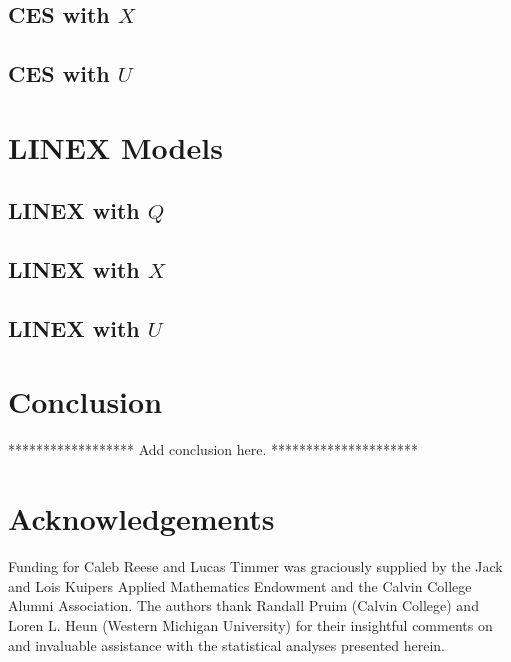 \documentclass[preprint,authoryear,12pt]{elsarticle}\usepackage{graphicx, color}
\begin{document}
\subsection{CES with $X$}

\subsection{CES with $U$}

\section{LINEX Models}

\subsection{LINEX with $Q$}

\subsection{LINEX with $X$}

\subsection{LINEX with $U$}

\section{Conclusion}

****************** Add conclusion here. *********************

\section*{Acknowledgements}

Funding for Caleb Reese and Lucas Timmer was graciously supplied by the Jack and Lois Kuipers Applied Mathematics Endowment and the Calvin College Alumni Association. The authors thank Randall Pruim (Calvin College) and Loren L. Heun (Western Michigan University) for their insightful comments on and invaluable assistance with the statistical analyses presented herein.

\end{document}
